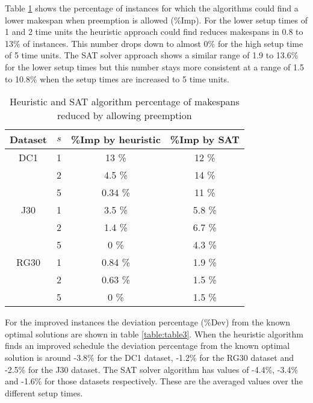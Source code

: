 Table \ref{table:table2} shows the percentage of instances for which the algorithms could find a lower makespan when preemption is allowed (\%Imp). For the lower setup times of 1 and 2 time units the heuristic approach could find reduces makespans in 0.8 to 13\% of instances. This number drops down to almost 0\% for the high setup time of 5 time units. The SAT solver approach shows a similar range of 1.9 to 13.6\% for the lower setup times but this number stays more consistent at a range of 1.5 to 10.8\% when the setup times are increased to 5 time units.

\begin{table}
	\begin{center}
		\caption{Heuristic and SAT algorithm percentage of makespans reduced by allowing preemption}
		\label{table:table2}
		\begin{tabular}{ c | c c c }
			Dataset & \(s\) & \%Imp by heuristic & \%Imp by SAT \\
			\hline
			DC1  & 1 & 13 \% & 12 \% \\ 
			  & 2 & 4.5 \% & 14 \% \\  
			  & 5 & 0.34 \% & 11 \% \\ 
			J30  & 1 & 3.5 \% & 5.8 \% \\ 
			  & 2 & 1.4 \% & 6.7 \% \\  
			  & 5 & 0 \% & 4.3 \% \\ 
			RG30 & 1 & 0.84 \% & 1.9 \% \\ 
			 & 2 & 0.63 \% & 1.5 \% \\  
			 & 5 & 0 \% & 1.5 \%
		\end{tabular}
	\end{center}
\end{table}

For the improved instances the deviation percentage (\%Dev) from the known optimal solutions are shown in table \ref{table:table3}. When the heuristic algorithm finds an improved schedule the deviation percentage from the known optimal solution is around -3.8\% for the DC1 dataset, -1.2\% for the RG30 dataset and -2.5\% for the J30 dataset. The SAT solver algorithm has values of -4.4\%, -3.4\% and -1.6\% for those datasets respectively. These are the averaged values over the different setup times.

